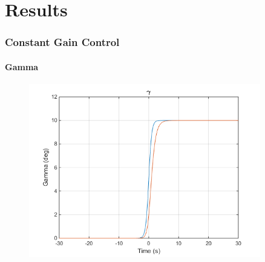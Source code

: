 \documentclass{beamer}
\begin{document}
    \section{Results}
    \begin{frame}
        \frametitle{Constant Gain Control}
        \framesubtitle{Gamma}
        \begin{figure}
            \centering
            \includegraphics[width=0.9\textwidth]{gamma.png}
        \end{figure}
    \end{frame}
\end{document}
